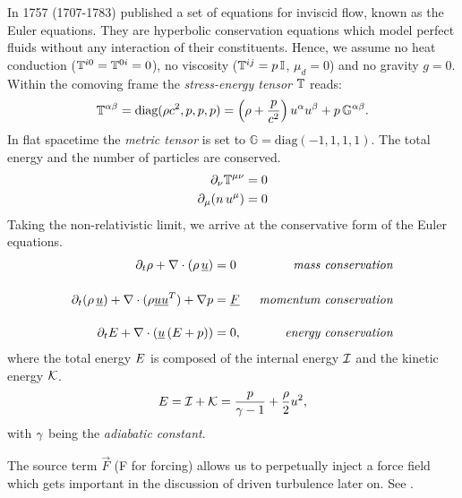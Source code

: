 In 1757  (1707-1783) published a set of equations for
inviscid flow, known as the Euler equations. They are hyperbolic
conservation equations which model perfect fluids without any interaction of their
constituents.  Hence, we assume no
heat conduction ($\mathbb{T}^{i0} = \mathbb{T}^{0i} = 0$), no viscosity
($\mathbb{T}^{ij} = p\,\mathbb{I}$, $\mu_d = 0$) and no gravity $g = 0$. 
Within the comoving frame the
\emph{stress-energy tensor} $\mathbb{T}$ reads:
\begin{equation}
\mathbb{T}^{\alpha\beta} = \text{diag}(\rho c^2,p,p,p) = \left(\rho + \frac{p}{c^2}\right) u^\alpha u^\beta + p\,\mathbb{G}^{\alpha\beta}.
\end{equation}
In flat spacetime the \emph{metric tensor} is set to $\mathbb{G} = \text{diag}(-1,1,1,1)$. The total energy
and the number of particles are conserved.
\begin{align}
\partial_\nu \mathbb{T}^{\mu\nu}  &= 0\\
\partial_\mu (n\,u^\mu) &= 0
\end{align}
Taking the non-relativistic limit, we arrive at the conservative form of the
Euler equations.
\begin{align}
\label{eqn:comp-euler-conservative}
\partial_t\rho + \nabla \cdot (\rho\,\underline{u})   &=  0 \;\; &\text{\emph{mass conservation}}\\[0.4cm]
\partial_t(\rho\,\underline{u}) + \nabla\cdot(\rho\underline{u}\underline{u}^T) + \nabla p &= \underline{F}  \;\;&\text{\emph{momentum conservation}}\\[0.4cm]
\partial_t E + \nabla \cdot (\underline{u}\,(E + p)) &=  0,\;\;&\text{\emph{energy conservation}}
\end{align}
where the total energy $E$ is composed of the internal energy $\mathcal{I}$ and
the kinetic energy $\mathcal{K}$.
\begin{equation}
E = \mathcal{I} + \mathcal{K} = \frac{p}{\gamma -1} + \frac{\rho}{2}u^2,
\end{equation}
with $\gamma$ being the \emph{adiabatic constant}.

The source term $\vec{F}$ (F for forcing) allows us to perpetually inject a
force field which gets important in the discussion of driven turbulence later
on. See .


